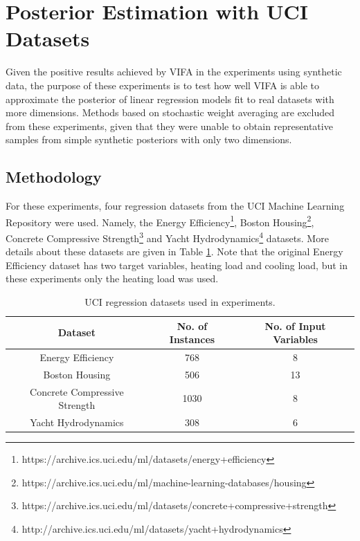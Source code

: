 \documentclass[msc,deptreport.inf]{infthesis} %
\begin{document}
\section{Posterior Estimation with UCI Datasets}

Given the positive results achieved by VIFA in the experiments using synthetic data, the purpose of these experiments is to test how well VIFA is able to approximate the posterior of linear regression models fit to real datasets with more dimensions. Methods based on stochastic weight averaging are excluded from these experiments, given that they were unable to obtain representative samples from simple synthetic posteriors with only two dimensions. 

\subsection{Methodology}

For these experiments, four regression datasets from the UCI Machine Learning Repository \cite{dua2019} were used. Namely, the Energy Efficiency\footnote{https://archive.ics.uci.edu/ml/datasets/energy+efficiency}, Boston Housing\footnote{https://archive.ics.uci.edu/ml/machine-learning-databases/housing}, Concrete Compressive Strength\footnote{https://archive.ics.uci.edu/ml/datasets/concrete+compressive+strength} and Yacht Hydrodynamics\footnote{http://archive.ics.uci.edu/ml/datasets/yacht+hydrodynamics} datasets. More details about these datasets are given in Table \ref{table:uci_datasets}. Note that the original Energy Efficiency dataset has two target variables, heating load and cooling load, but in these experiments only the heating load was used. 

\begin{table}[h!]
	\begin{center}
		\begin{tabular}{||c c c ||} 
			\hline
 			Dataset & No. of Instances & No. of Input Variables \\ [0.5ex] 
			\hline\hline
			Energy Efficiency 				& 768 	& 8 \\
 			\hline
 			Boston Housing 				& 506 	& 13 \\ 
 			\hline
 			Concrete Compressive Strength 	& 1030 	& 8 \\
 			\hline
 			Yacht Hydrodynamics 			& 308 	& 6 \\ [1ex] 
 			\hline
		\end{tabular}
		\caption{UCI regression datasets used in experiments.}
		\label{table:uci_datasets}
	\end{center}
\end{table}
\end{document}
